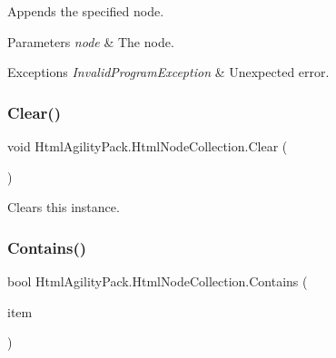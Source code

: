 Appends the specified node. 


\begin{DoxyParams}{Parameters}
{\em node} & The node.\\
\hline
\end{DoxyParams}

\begin{DoxyExceptions}{Exceptions}
{\em Invalid\+Program\+Exception} & Unexpected error.\\
\hline
\end{DoxyExceptions}
\mbox{\label{class_html_agility_pack_1_1_html_node_collection_a2b51957914a0ef7b394f28df64367151}} 
\subsubsection{\texorpdfstring{Clear()}{Clear()}}
{\footnotesize\ttfamily void Html\+Agility\+Pack.\+Html\+Node\+Collection.\+Clear (\begin{DoxyParamCaption}{ }\end{DoxyParamCaption})\hspace{0.3cm}{\ttfamily [inline]}}



Clears this instance. 

\mbox{\label{class_html_agility_pack_1_1_html_node_collection_acc3db502d0905dd71ab9ede99aa7e097}} 
\subsubsection{\texorpdfstring{Contains()}{Contains()}}
{\footnotesize\ttfamily bool Html\+Agility\+Pack.\+Html\+Node\+Collection.\+Contains (\begin{DoxyParamCaption}\item[{\hyperlink{class_html_agility_pack_1_1_html_node}{Html\+Node}}]{item }\end{DoxyParamCaption})\hspace{0.3cm}{\ttfamily [inline]}}



